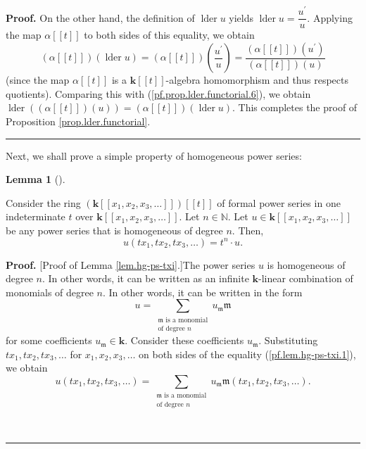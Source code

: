 \documentclass[numbers=enddot,12pt,final,onecolumn,notitlepage]{scrartcl}%
\theoremstyle{definition}
\newtheorem{lem}[theo]{Lemma}
\newenvironment{lemma}[1][]
{\begin{lem}[#1]\begin{leftbar}}
{\end{leftbar}\end{lem}}
\newenvironment{proof}[1][Proof]{\noindent\textbf{#1.} }{\ \rule{0.5em}{0.5em}}
\let\sumnonlimits\sum
\renewcommand{\sum}{\sumnonlimits\limits}
\newenvironment{verlong}{}{}
\begin{document}
\begin{verlong}
\begin{proof}
On the other hand, the definition of $\operatorname*{lder}u$ yields
$\operatorname*{lder}u=\dfrac{u^{\prime}}{u}$. Applying the map $\alpha\left[
\left[  t\right]  \right]  $ to both sides of this equality, we obtain%
\[
\left(  \alpha\left[  \left[  t\right]  \right]  \right)  \left(
\operatorname*{lder}u\right)  =\left(  \alpha\left[  \left[  t\right]
\right]  \right)  \left(  \dfrac{u^{\prime}}{u}\right)  =\dfrac{\left(
\alpha\left[  \left[  t\right]  \right]  \right)  \left(  u^{\prime}\right)
}{\left(  \alpha\left[  \left[  t\right]  \right]  \right)  \left(  u\right)
}%
\]
(since the map $\alpha\left[  \left[  t\right]  \right]  $ is a $\mathbf{k}%
\left[  \left[  t\right]  \right]  $-algebra homomorphism and thus respects
quotients). Comparing this with (\ref{pf.prop.lder.functorial.6}), we obtain
$\operatorname*{lder}\left(  \left(  \alpha\left[  \left[  t\right]  \right]
\right)  \left(  u\right)  \right)  =\left(  \alpha\left[  \left[  t\right]
\right]  \right)  \left(  \operatorname*{lder}u\right)  $. This completes the
proof of Proposition \ref{prop.lder.functorial}.
\end{proof}

Next, we shall prove a simple property of homogeneous power series:

\begin{lemma}
\label{lem.hg-ps-txi}Consider the ring $\left(  \mathbf{k}\left[  \left[
x_{1},x_{2},x_{3},\ldots\right]  \right]  \right)  \left[  \left[  t\right]
\right]  $ of formal power series in one indeterminate $t$ over $\mathbf{k}%
\left[  \left[  x_{1},x_{2},x_{3},\ldots\right]  \right]  $. Let
$n\in\mathbb{N}$. Let $u\in\mathbf{k}\left[  \left[  x_{1},x_{2},x_{3}%
,\ldots\right]  \right]  $ be any power series that is homogeneous of degree
$n$. Then,%
\[
u\left(  tx_{1},tx_{2},tx_{3},\ldots\right)  =t^{n}\cdot u.
\]

\end{lemma}

\begin{proof}
[Proof of Lemma \ref{lem.hg-ps-txi}.]The power series $u$ is homogeneous of
degree $n$. In other words, it can be written as an infinite $\mathbf{k}%
$-linear combination of monomials of degree $n$. In other words, it can be
written in the form%
\begin{equation}
u=\sum_{\substack{\mathfrak{m}\text{ is a monomial}\\\text{of degree }%
n}}u_{\mathfrak{m}}\mathfrak{m} \label{pf.lem.hg-ps-txi.1}%
\end{equation}
for some coefficients $u_{\mathfrak{m}}\in\mathbf{k}$. Consider these
coefficients $u_{\mathfrak{m}}$. Substituting $tx_{1},tx_{2},tx_{3},\ldots$
for $x_{1},x_{2},x_{3},\ldots$ on both sides of the equality
(\ref{pf.lem.hg-ps-txi.1}), we obtain%
\begin{equation}
u\left(  tx_{1},tx_{2},tx_{3},\ldots\right)  =\sum_{\substack{\mathfrak{m}%
\text{ is a monomial}\\\text{of degree }n}}u_{\mathfrak{m}}\mathfrak{m}\left(
tx_{1},tx_{2},tx_{3},\ldots\right)  . \label{pf.lem.hg-ps-txi.2}%
\end{equation}



\end{proof}
\end{verlong}
\end{document}

